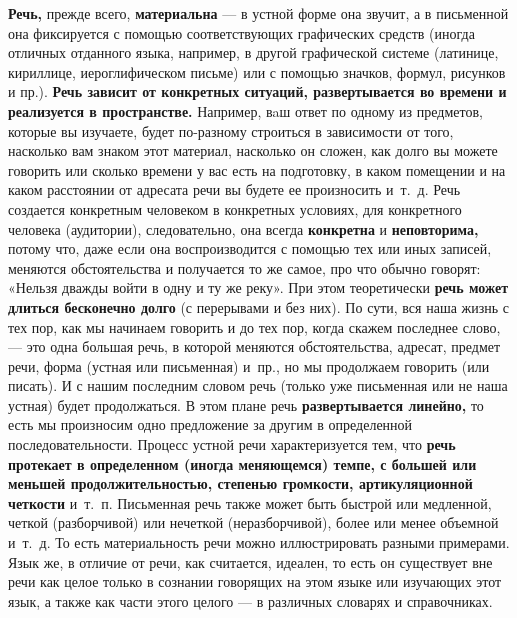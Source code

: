\textbf{Речь,} прежде всего, \textbf{материальна} — в устной форме она звучит, а в письменной она фиксируется с помощью соответствующих графических средств (иногда отличных отданного языка, например, в другой графической системе (латинице, кириллице, иероглифическом письме) или с помощью значков, формул, рисунков и пр.).
\textbf{Речь зависит от конкретных ситуаций, развертывается во времени и реализуется в пространстве.}
Например, вaш ответ по одному из предметов, которые вы изучаете, будет по-разному строиться в зависимости от того, насколько вам знаком этот материал, насколько он сложен, как долго вы можете говорить или сколько времени у вас есть на подготовку, в каком помещении и на каком расстоянии от адресата речи вы будете ее произносить и~т.~д.
Речь создается конкретным человеком в конкретных условиях, для конкретного человека (аудитории), следовательно, она всегда \textbf{конкретна} и \textbf{неповторима,} потому что, даже если она воспроизводится с помощью тех или иных записей, меняются обстоятельства и получается то же самое, про что обычно говорят: «Нельзя дважды войти в одну и ту же реку».
При этом теоретически \textbf{речь может длиться бесконечно долго} (с перерывами и без них).
По сути, вся наша жизнь с тех пор, как мы начинаем говорить и до тех пор, когда скажем последнее слово, --- это одна большая речь, в которой меняются обстоятельства, адресат, предмет речи, форма (устная или письменная) и~пр., но мы продолжаем говорить (или писать).
И с нашим последним словом речь (только уже письменная или не наша устная) будет продолжаться.
В этом плане речь \textbf{развертывается линейно,} то есть мы произносим одно предложение за другим в определенной последовательности.
Процесс устной речи характеризуется тем, что \textbf{речь протекает в определенном (иногда меняющемся) темпе, с большей или меньшей продолжительностью, степенью громкости, артикуляционной четкости} и~т.~п.
Письменная речь также может быть быстрой или медленной, четкой (разборчивой) или нечеткой (неразборчивой), более или менее объемной и~т.~д.
То есть материальность речи можно иллюстрировать разными примерами.
Язык же, в отличие от речи, как считается, идеален, то есть он существует вне речи как целое только в сознании говорящих на этом языке или изучающих этот язык, а также как части этого целого — в различных словарях и справочниках.

